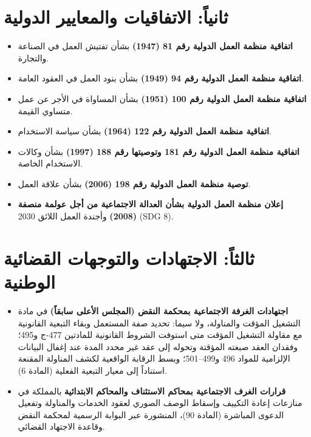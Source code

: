 \section*{ثانياً: الاتفاقيات والمعايير الدولية}
\begin{itemize}[leftmargin=*, itemsep=5pt]
    \item \textbf{اتفاقية منظمة العمل الدولية رقم \textenglish{81} (\textenglish{1947})} بشأن تفتيش العمل في الصناعة والتجارة.
    \item \textbf{اتفاقية منظمة العمل الدولية رقم \textenglish{94} (\textenglish{1949})} بشأن بنود العمل في العقود العامة.
    \item \textbf{اتفاقية منظمة العمل الدولية رقم \textenglish{100} (\textenglish{1951})} بشأن المساواة في الأجر عن عمل متساوي القيمة.
    \item \textbf{اتفاقية منظمة العمل الدولية رقم \textenglish{122} (\textenglish{1964})} بشأن سياسة الاستخدام.
    \item \textbf{اتفاقية منظمة العمل الدولية رقم \textenglish{181} وتوصيتها رقم \textenglish{188} (\textenglish{1997})} بشأن وكالات الاستخدام الخاصة.
    \item \textbf{توصية منظمة العمل الدولية رقم \textenglish{198} (\textenglish{2006})} بشأن علاقة العمل.
    \item \textbf{إعلان منظمة العمل الدولية بشأن العدالة الاجتماعية من أجل عولمة منصفة (\textenglish{2008})} وأجندة العمل اللائق \textenglish{2030} (\textenglish{SDG 8}).
\end{itemize}

\section*{ثالثاً: الاجتهادات والتوجهات القضائية الوطنية}
\begin{itemize}[leftmargin=*, itemsep=5pt]
    \item \textbf{اجتهادات الغرفة الاجتماعية بمحكمة النقض (المجلس الأعلى سابقاً)} في مادة التشغيل المؤقت والمناولة، ولا سيما: تحديد صفة المستعمل وبقاء التبعية القانونية مع مقاولة التشغيل المؤقت متى استوفت الشروط القانونية للمادتين \textenglish{477-ج} و\textenglish{495}؛ وفقدان العقد صبغته المؤقتة وتحوله إلى عقد غير محدد المدة عند إغفال البيانات الإلزامية للمواد \textenglish{496} و\textenglish{499}--\textenglish{501}؛ وبسط الرقابة الواقعية لكشف المناولة المقنعة استناداً إلى معيار التبعية الفعلية (المادة \textenglish{6}).
    \item \textbf{قرارات الغرف الاجتماعية بمحاكم الاستئناف والمحاكم الابتدائية} بالمملكة في منازعات إعادة التكييف وإسقاط الوصف الصوري لعقود الخدمات والمناولة وتفعيل الدعوى المباشرة (المادة \textenglish{90})، المنشورة عبر البوابة الرسمية لمحكمة النقض وقاعدة الاجتهاد القضائي.
\end{itemize}

